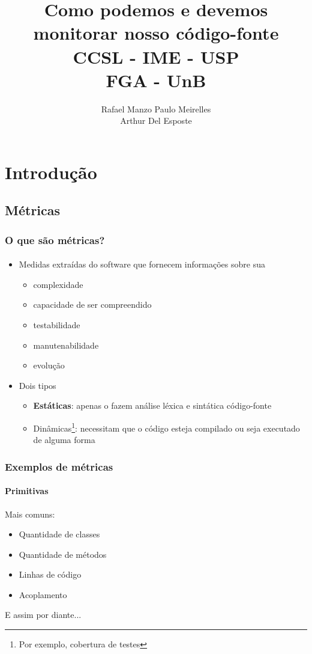 \documentclass{beamer}
\title{
       \textbf{Como podemos e devemos monitorar nosso código-fonte} \\
       CCSL - IME - USP\\
       FGA - UnB
      }
\author{
        Rafael Manzo
        Paulo Meirelles \\
        Arthur Del Esposte \\
       }
\begin{document}
\maketitle

\section{Introdução}
  \subsection{Métricas}
  \begin{frame}
    \frametitle{O que são métricas?}
    \framesubtitle{}

    \begin{itemize}
      \item Medidas extraídas do software que fornecem informações sobre sua
        \begin{itemize}
          \item complexidade
          \item capacidade de ser compreendido
          \item testabilidade
          \item manutenabilidade
          \item evolução
        \end{itemize}
      \item Dois tipos
        \begin{itemize}
          \item \textbf{Estáticas}: apenas o fazem análise léxica e sintática código-fonte
          \item Dinâmicas\footnote{Por exemplo, cobertura de testes}: necessitam que o código esteja compilado ou seja executado de alguma forma
        \end{itemize}
    \end{itemize}
  \end{frame}

  \begin{frame}
    \frametitle{Exemplos de métricas}
    \framesubtitle{Primitivas}

    Mais comuns:
    \begin{itemize}
      \item Quantidade de classes
      \item Quantidade de métodos
      \item Linhas de código
      \item Acoplamento
    \end{itemize}

    E assim por diante...
  \end{frame}
\end{document}
